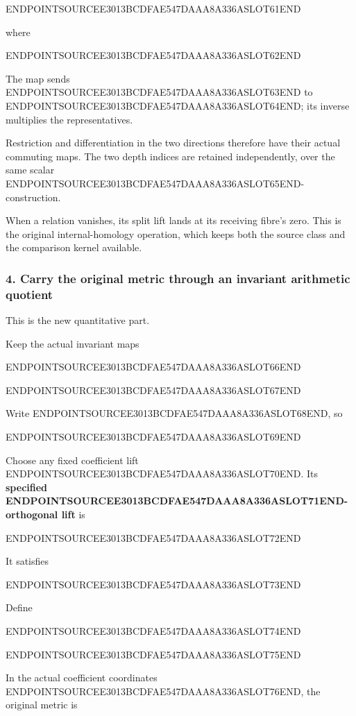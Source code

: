 ENDPOINTSOURCEE3013BCDFAE547DAAA8A336ASLOT61END

where

ENDPOINTSOURCEE3013BCDFAE547DAAA8A336ASLOT62END

The map sends ENDPOINTSOURCEE3013BCDFAE547DAAA8A336ASLOT63END to ENDPOINTSOURCEE3013BCDFAE547DAAA8A336ASLOT64END; its inverse multiplies the representatives.

Restriction and differentiation in the two directions therefore have their actual commuting maps. The two depth indices are retained independently, over the same scalar ENDPOINTSOURCEE3013BCDFAE547DAAA8A336ASLOT65END-construction.

When a relation vanishes, its split lift lands at its receiving fibre's zero. This is the original internal-homology operation, which keeps both the source class and the comparison kernel available.

\subsubsection{4. Carry the original metric through an invariant arithmetic quotient}\label{endpoint-exponential_constituent_original--carry-the-original-metric-through-an-invariant-arithmetic-quotient}

This is the new quantitative part.

Keep the actual invariant maps

ENDPOINTSOURCEE3013BCDFAE547DAAA8A336ASLOT66END

ENDPOINTSOURCEE3013BCDFAE547DAAA8A336ASLOT67END

Write ENDPOINTSOURCEE3013BCDFAE547DAAA8A336ASLOT68END, so

ENDPOINTSOURCEE3013BCDFAE547DAAA8A336ASLOT69END

Choose any fixed coefficient lift ENDPOINTSOURCEE3013BCDFAE547DAAA8A336ASLOT70END. Its \textbf{specified ENDPOINTSOURCEE3013BCDFAE547DAAA8A336ASLOT71END-orthogonal lift} is

ENDPOINTSOURCEE3013BCDFAE547DAAA8A336ASLOT72END

It satisfies

ENDPOINTSOURCEE3013BCDFAE547DAAA8A336ASLOT73END

Define

ENDPOINTSOURCEE3013BCDFAE547DAAA8A336ASLOT74END

ENDPOINTSOURCEE3013BCDFAE547DAAA8A336ASLOT75END

In the actual coefficient coordinates ENDPOINTSOURCEE3013BCDFAE547DAAA8A336ASLOT76END, the original metric is

